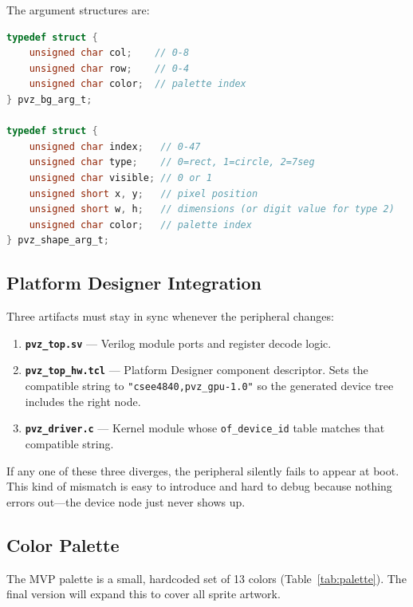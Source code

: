 \documentclass[11pt,letterpaper]{article}
\begin{document}
The argument structures are:

\begin{lstlisting}[language=C, caption={Driver argument structures.}]
typedef struct {
    unsigned char col;    // 0-8
    unsigned char row;    // 0-4
    unsigned char color;  // palette index
} pvz_bg_arg_t;

typedef struct {
    unsigned char index;   // 0-47
    unsigned char type;    // 0=rect, 1=circle, 2=7seg
    unsigned char visible; // 0 or 1
    unsigned short x, y;   // pixel position
    unsigned short w, h;   // dimensions (or digit value for type 2)
    unsigned char color;   // palette index
} pvz_shape_arg_t;
\end{lstlisting}

\subsection{Platform Designer Integration}

Three artifacts must stay in sync whenever the peripheral changes:

\begin{enumerate}[nosep]
  \item \textbf{\texttt{pvz\_top.sv}} --- Verilog module ports and
    register decode logic.
  \item \textbf{\texttt{pvz\_top\_hw.tcl}} --- Platform Designer
    component descriptor. Sets the compatible string to
    \texttt{"csee4840,pvz\_gpu-1.0"} so the generated device tree
    includes the right node.
  \item \textbf{\texttt{pvz\_driver.c}} --- Kernel module whose
    \texttt{of\_device\_id} table matches that compatible string.
\end{enumerate}

If any one of these three diverges, the peripheral silently fails to
appear at boot. This kind of mismatch is easy to introduce and hard
to debug because nothing errors out---the device node just never shows
up.

\subsection{Color Palette}
\label{sec:palette}

The MVP palette is a small, hardcoded set of 13 colors (Table~\ref{tab:palette}).
The final version will expand this to cover all sprite artwork.
\end{document}
